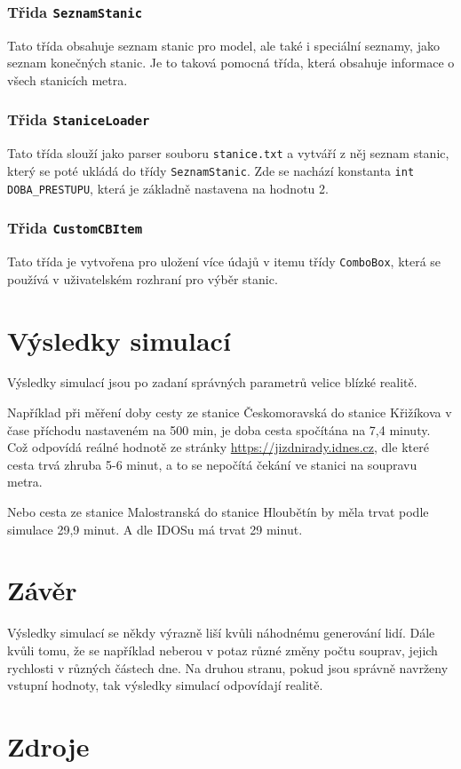 \documentclass[12pt, a4paper]{article}
\begin{document}
\subsubsection{Třida \texttt{SeznamStanic}}
Tato třída obsahuje seznam stanic pro model, ale také i speciální seznamy, jako seznam konečných stanic. Je to taková pomocná třída, která obsahuje informace o všech stanicích metra.

\subsubsection{Třida \texttt{StaniceLoader}}
Tato třída slouží jako parser souboru \texttt{stanice.txt} a vytváří z něj seznam stanic, který se poté ukládá do třídy \texttt{SeznamStanic}. Zde se nachází konstanta \texttt{int DOBA\_PRESTUPU}, která je základně nastavena na hodnotu 2.

\subsubsection{Třida \texttt{CustomCBItem}}
Tato třída je vytvořena pro uložení více údajů v itemu třídy \texttt{ComboBox}, která se používá v uživatelském rozhraní pro výběr stanic.

\section{Výsledky simulací}
Výsledky simulací jsou po zadaní správných parametrů velice blízké realitě. 

Například při měření doby cesty ze stanice Českomoravská do stanice Křižíkova v čase příchodu nastaveném na 500 min, je doba cesta spočítána na 7,4 minuty. Což odpovídá reálné hodnotě ze stránky \url{https://jizdnirady.idnes.cz}, dle které cesta trvá zhruba 5-6 minut, a to se nepočítá čekání ve stanici na soupravu metra.

Nebo cesta ze stanice Malostranská do stanice Hloubětín by měla trvat podle simulace 29,9 minut. A dle IDOSu má trvat 29 minut.
\section{Závěr}
Výsledky simulací se někdy výrazně liší kvůli náhodnému generování lidí. Dále kvůli tomu, že se například neberou v potaz různé změny počtu souprav, jejich rychlosti v různých částech dne.
Na druhou stranu, pokud jsou správně navrženy vstupní hodnoty, tak výsledky simulací odpovídají realitě.
\section{Zdroje}
\nocite{*}
\printbibliography[heading=none]
\end{document}
